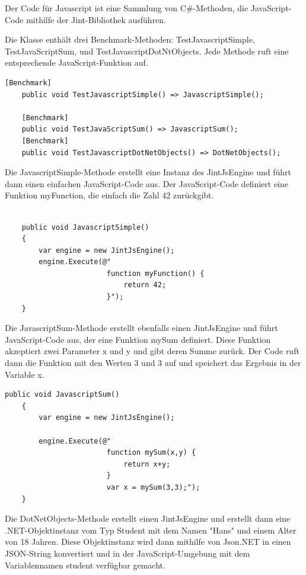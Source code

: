         Der Code für Javascript ist eine Sammlung von C\#-Methoden, die JavaScript-Code mithilfe der Jint-Bibliothek ausführen. 

Die Klasse enthält drei Benchmark-Methoden: TestJavascriptSimple, TestJavaScriptSum, und TestJavascriptDotNtObjects. Jede Methode ruft eine entsprechende JavaScript-Funktion auf.

\begin{lstlisting}[language={[Sharp]C}, caption=JavaScriptBenchmark, label=lst:imp:jsBench]
    [Benchmark]
    public void TestJavascriptSimple() => JavascriptSimple();

    [Benchmark]
    public void TestJavaScriptSum() => JavascriptSum();
    [Benchmark]
    public void TestJavascriptDotNetObjects() => DotNetObjects();
\end{lstlisting}

Die JavascriptSimple-Methode erstellt eine Instanz des JintJsEngine und führt dann einen einfachen JavaScript-Code aus. Der JavaScript-Code definiert eine Funktion myFunction, die einfach die Zahl 42 zurückgibt.
\begin{lstlisting}[language={[Sharp]C}, caption=JavascriptSimple, label=lst:imp:jsSimple]
    
    public void JavascriptSimple()
    {
        var engine = new JintJsEngine();           
        engine.Execute(@"
                        function myFunction() {
                            return 42;
                        }");           
    }
\end{lstlisting}

Die JavascriptSum-Methode erstellt ebenfalls einen JintJsEngine und führt JavaScript-Code aus, der eine Funktion mySum definiert. Diese Funktion akzeptiert zwei Parameter x und y und gibt deren Summe zurück. Der Code ruft dann die Funktion mit den Werten 3 und 3 auf und speichert das Ergebnis in der Variable x.

\begin{lstlisting}[language={[Sharp]C}, caption=JavascriptSum, label=lst:imp:jsSum]
    public void JavascriptSum()
    {
        var engine = new JintJsEngine();

        engine.Execute(@"
                        function mySum(x,y) {
                            return x+y;
                        }
                        var x = mySum(3,3);");
    }
\end{lstlisting}
\newpage
Die DotNetObjects-Methode erstellt einen JintJsEngine und erstellt dann eine .NET-Objektinstanz vom Typ Student mit dem Namen "Hans" und einem Alter von 18 Jahren. Diese Objektinstanz wird dann mithilfe von Json.NET in einen JSON-String konvertiert und in der JavaScript-Umgebung mit dem Variablennamen student verfügbar gemacht.

